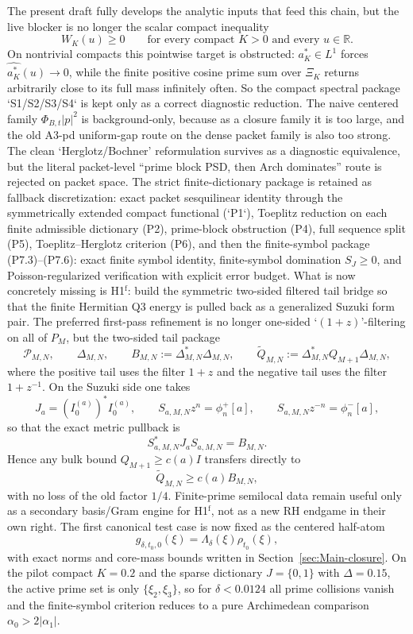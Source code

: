 The present draft fully develops the analytic inputs that feed this chain, but
the live blocker is no longer the scalar compact inequality
\[
  W_K(u)\ge0\qquad\text{for every compact }K>0\text{ and every }u\in\mathbb R.
\]
On nontrivial compacts this pointwise target is obstructed: $a_K^*\in L^1$
forces $\widehat{a_K^*}(u)\to0$, while the finite positive cosine prime sum
over $\Xi_K$ returns arbitrarily close to its full mass infinitely often. So the
compact spectral package `S1/S2/S3/S4` is kept only as a correct diagnostic
reduction. The naive centered family $\Phi_{B,t}|p|^2$ is background-only,
because as a closure family it is too large, and the old \textup{A3-pd} uniform-gap
route on the dense packet family is also too strong. The clean
`Herglotz/Bochner' reformulation survives as a diagnostic equivalence, but the
literal packet-level ``prime block PSD, then Arch dominates'' route is rejected on
packet space. The strict finite-dictionary package is retained as fallback
discretization: exact packet sesquilinear identity through the symmetrically
extended compact functional (`P1`), Toeplitz reduction on each finite
admissible dictionary \textup{(P2)}, prime-block obstruction \textup{(P4)}, full sequence split
\textup{(P5)}, Toeplitz--Herglotz criterion \textup{(P6)}, and then the finite-symbol package
\textup{(P7.3)}--\textup{(P7.6)}: exact finite symbol identity, finite-symbol domination $S_J\ge0$,
and Poisson-regularized verification with explicit error budget. What is now
concretely missing is \textup{H1}$^{\mathrm f}$: build the symmetric two-sided
filtered tail bridge so that the finite Hermitian Q3 energy is pulled back as a
generalized Suzuki form pair. The preferred first-pass refinement is no longer
one-sided `$(1+z)$'-filtering on all of $P_M$, but the two-sided tail package
\[
  \mathcal P_{M,N},\qquad
  \Delta_{M,N},\qquad
  B_{M,N}:=\Delta_{M,N}^*\Delta_{M,N},\qquad
  \widetilde Q_{M,N}:=\Delta_{M,N}^*Q_{M+1}\Delta_{M,N},
\]
where the positive tail uses the filter $1+z$ and the negative tail uses the
filter $1+z^{-1}$. On the Suzuki side one takes
\[
  J_a=(I_0^{(a)})^*I_0^{(a)},
  \qquad
  S_{a,M,N}z^n=\phi_n^+[a],\qquad
  S_{a,M,N}z^{-n}=\phi_n^-[a],
\]
so that the exact metric pullback is
\[
  S_{a,M,N}^*J_aS_{a,M,N}=B_{M,N}.
\]
Hence any bulk bound $Q_{M+1}\ge c(a)I$ transfers directly to
\[
  \widetilde Q_{M,N}\ge c(a)B_{M,N},
\]
with no loss of the old factor $1/4$. Finite-prime semilocal data remain useful
only as a secondary basis/Gram engine for \textup{H1}$^{\mathrm f}$, not as a
new RH endgame in their own right.
The first canonical test case is now fixed as the centered half-atom
\[
  g_{\delta,t_0,0}(\xi)=\Lambda_\delta(\xi)\rho_{t_0}(\xi),
\]
with exact norms and core-mass bounds written in Section~\ref{sec:Main-closure}.
On the pilot compact $K=0.2$ and the sparse dictionary $J=\{0,1\}$ with
$\Delta=0.15$, the active prime set is only $\{\xi_2,\xi_3\}$, so for
$\delta<0.0124$ all prime collisions vanish and the finite-symbol criterion
reduces to a pure Archimedean comparison $\alpha_0>2|\alpha_1|$.

